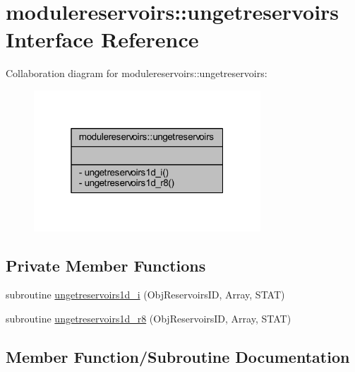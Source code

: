 \hypertarget{interfacemodulereservoirs_1_1ungetreservoirs}{}\section{modulereservoirs\+:\+:ungetreservoirs Interface Reference}
\label{interfacemodulereservoirs_1_1ungetreservoirs}


Collaboration diagram for modulereservoirs\+:\+:ungetreservoirs\+:\nopagebreak
\begin{figure}[H]
\begin{center}
\leavevmode
\includegraphics[width=241pt]{interfacemodulereservoirs_1_1ungetreservoirs__coll__graph}
\end{center}
\end{figure}
\subsection*{Private Member Functions}
\begin{DoxyCompactItemize}
\item 
subroutine \mbox{\hyperlink{interfacemodulereservoirs_1_1ungetreservoirs_a21df91f41ee64d90a0f18f2a55cb9d32}{ungetreservoirs1d\+\_\+i}} (Obj\+Reservoirs\+ID, Array, S\+T\+AT)
\item 
subroutine \mbox{\hyperlink{interfacemodulereservoirs_1_1ungetreservoirs_a569d835370d6fe8ac249694c84dc5a12}{ungetreservoirs1d\+\_\+r8}} (Obj\+Reservoirs\+ID, Array, S\+T\+AT)
\end{DoxyCompactItemize}


\subsection{Member Function/\+Subroutine Documentation}
\mbox{\label{interfacemodulereservoirs_1_1ungetreservoirs_a21df91f41ee64d90a0f18f2a55cb9d32}} 
